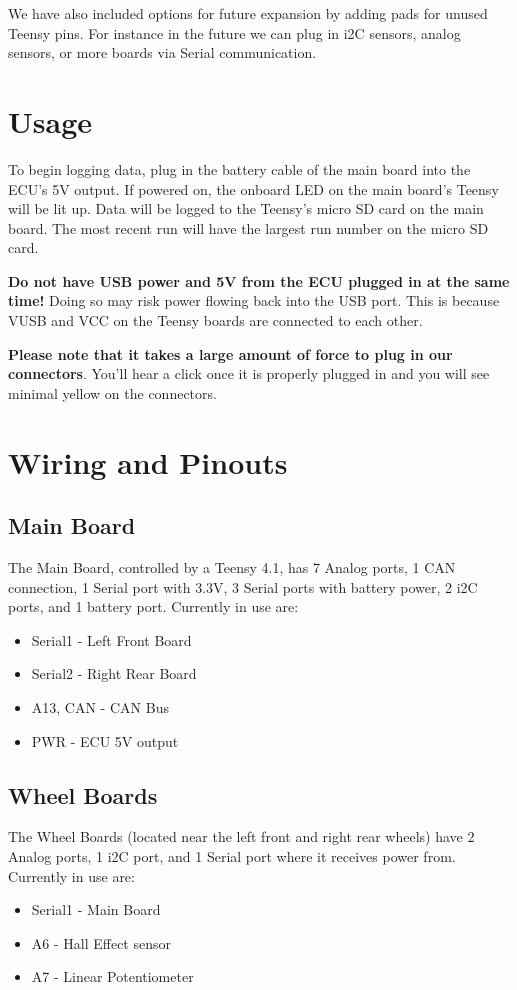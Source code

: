 \documentclass[12pt]{article}
\begin{document}
We have also included options for future expansion by adding pads for unused Teensy pins.
For instance in the future we can plug in i2C sensors, analog sensors, or more boards via Serial communication. 

\section{Usage}
To begin logging data, plug in the battery cable of the main board into the ECU's 5V output.
If powered on, the onboard LED on the main board's Teensy will be lit up.
Data will be logged to the Teensy's micro SD card on the main board.
The most recent run will have the largest run number on the micro SD card.
\vspace{1em}

\textbf{Do not have USB power and 5V from the ECU plugged in at the same time!}
Doing so may risk power flowing back into the USB port.
This is because VUSB and VCC on the Teensy boards are connected to each other.
\vspace{1em}

\textbf{Please note that it takes a large amount of force to plug in our connectors}.
You'll hear a click once it is properly plugged in and you will see minimal yellow on the connectors.
\section{Wiring and Pinouts}
\subsection{Main Board}
The Main Board, controlled by a Teensy 4.1, has 7 Analog ports, 1 CAN connection, 1 Serial port with 3.3V, 3 Serial ports with battery power, 2 i2C ports, and 1 battery port.
Currently in use are:
\begin{itemize}
    \item Serial1 - Left Front Board
    \item Serial2 - Right Rear Board
    \item A13, CAN - CAN Bus
    \item PWR - ECU 5V output
\end{itemize}
\subsection{Wheel Boards}
The Wheel Boards (located near the left front and right rear wheels) have 2 Analog ports, 1 i2C port, and 1 Serial port where it receives power from.
Currently in use are:
\begin{itemize}
    \item Serial1 - Main Board
    \item A6 - Hall Effect sensor
    \item A7 - Linear Potentiometer
\end{itemize} 
\end{document}
